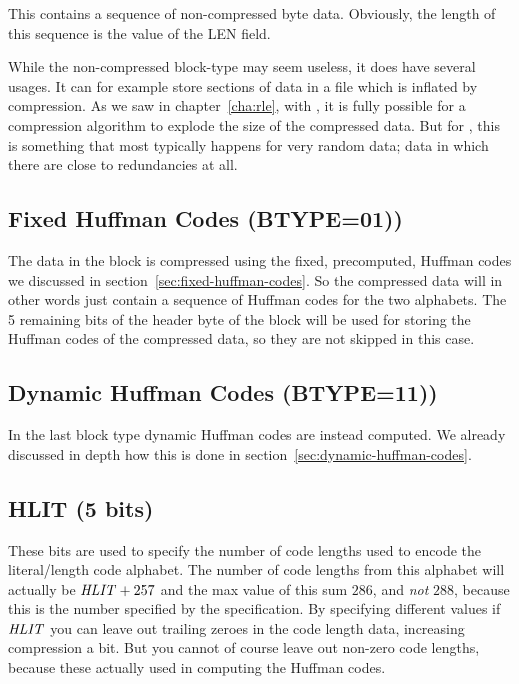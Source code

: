 This contains a sequence of non-compressed byte data. Obviously, the
length of this sequence is the value of the LEN field.

While the non-compressed block-type may seem useless, it does have
several usages. It can for example store sections of data in a file
which is inflated by compression. As we saw in chapter~\ref{cha:rle},
with \rle, it is fully possible for a compression algorithm to explode
the size of the compressed data. But for , this is something
that most typically happens for very random data; data in which there
are close to redundancies at all.

\subsection{Fixed Huffman Codes (BTYPE=01))}

The data in the block is compressed using the fixed, precomputed,
Huffman codes we discussed in
section~\ref{sec:fixed-huffman-codes}. So the compressed data will in
other words just contain a sequence of Huffman codes for the two
alphabets. The 5 remaining bits of the header byte of the block will
be used for storing the Huffman codes of the compressed data, so they
are not skipped in this case.

\subsection{Dynamic Huffman Codes (BTYPE=11))}

In the last block type dynamic Huffman codes are instead computed. We
already discussed in depth how this is done in
section~\ref{sec:dynamic-huffman-codes}.

\subsection{HLIT (5 bits)}

These bits are used to specify the number of code lengths used to
encode the literal/length code alphabet. The number of code lengths
from this alphabet will actually be $\mathit{HLIT} + 257$ and the max
value of this sum $286$, and \textit{not} $288$, because this is the
number specified by the  specification. By specifying different
values if $\mathit{HLIT}$ you can leave out trailing zeroes in the code
length data, increasing compression a bit. But you cannot of course
leave out non-zero code lengths, because these actually used in
computing the Huffman codes.

